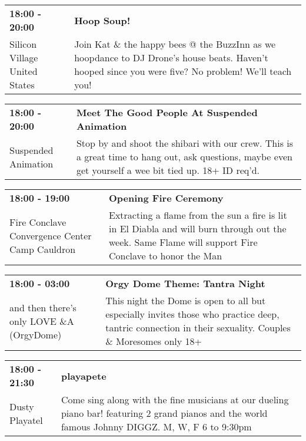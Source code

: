 \begin{tabular}{ p{1in} p{2.2in} }
    \textbf{18:00 - 20:00} & \textbf{Hoop Soup!} \\
    Silicon Village \newline United States & Join Kat \& the happy bees @ the BuzzInn as we hoopdance to DJ Drone's house beats.  Haven't hooped since you were five?  No problem!  We'll teach you! \\
    \hline 
\end{tabular}
    
\begin{tabular}{ p{1in} p{2.2in} }
    \textbf{18:00 - 20:00} & \textbf{Meet The Good People At Suspended Animation} \\
    Suspended Animation \newline  & Stop by and shoot the shibari with our crew. This is a great time to hang out, ask questions, maybe even get yourself a wee bit tied up. 18+ ID req'd. \\
    \hline 
\end{tabular}
    
\begin{tabular}{ p{1in} p{2.2in} }
    \textbf{18:00 - 19:00} & \textbf{Opening Fire Ceremony} \\
    Fire Conclave Convergence \newline Center Camp Cauldron & Extracting a flame from the sun a fire is lit in El Diabla and will burn through out the week. Same Flame will support Fire Conclave to honor the Man \\
    \hline 
\end{tabular}
    
\begin{tabular}{ p{1in} p{2.2in} }
    \textbf{18:00 - 03:00} & \textbf{Orgy Dome Theme: Tantra Night} \\
    and then there's only LOVE \newline 4\&A (OrgyDome) & This night the Dome is open to all but especially invites those who practice deep, tantric connection in their sexuality. Couples \& Moresomes only 18+ \\
    \hline 
\end{tabular}
    
\begin{tabular}{ p{1in} p{2.2in} }
    \textbf{18:00 - 21:30} & \textbf{playapete} \\
    Dusty Playatel \newline  & Come sing along with the fine musicians at our dueling piano bar! featuring 2 grand pianos and the world famous Johnny DIGGZ.  M, W, F  6 to 9:30pm \\
    \hline 
\end{tabular}
    
